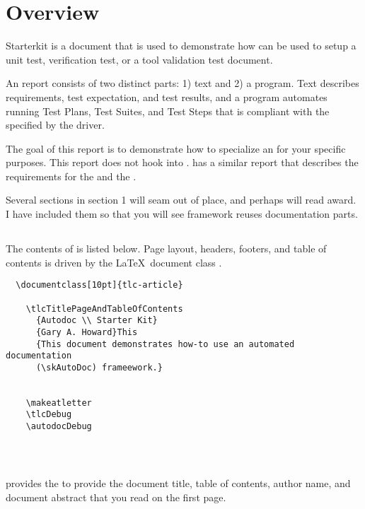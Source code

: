 \section{Overview}
Starterkit is a document that is used to demonstrate how \skAutoDoc can be
used to setup a unit test, verification test, or a tool validation test
document.

An \skAutoDoc report consists of two distinct parts: 1) text and 2) a
program. Text describes requirements, test expectation, and test results, and
a program automates running Test Plans, Test Suites, and Test Steps that is
compliant with the \skOutputFactory specified by the \skAmber driver.

The goal of this report is to demonstrate how to specialize an \skAutoDoc for your
specific purposes.  This report does not hook into \skAmber.  \skAmber has
a similar report that describes the requirements for the \skInputFactory and
the \skOutputFactory.

Several sections in section 1 will seam out of place, and perhaps will read
award. I have included them so that you will see \skAutoDoc framework reuses
documentation parts.

\subsection{\skStarterkit}
The contents of \skStarterkit is listed below.  Page layout, headers, footers,
and table of contents is driven by the \LaTeX\ document class \skTlcArticle.

\begin{verbatim}
  \documentclass[10pt]{tlc-article}
  
    \tlcTitlePageAndTableOfContents
      {Autodoc \\ Starter Kit}
      {Gary A. Howard}This
      {This document demonstrates how-to use an automated documentation
      (\skAutoDoc) frameework.}

    
    \makeatletter
    \tlcDebug
    \autodocDebug

  
\end{verbatim}

\subsection{\skToc}
\textbf{\skTlcArticle} provides the \skToc to provide the document title, table
of contents, author name, and document abstract that you read on the first page.

